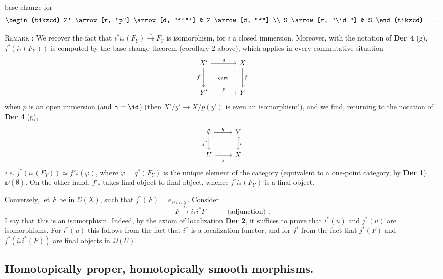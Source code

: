 
\noindent{}
base change for
\[
\begin{tikzcd}
Z' \arrow[r, "p"] \arrow[d, "f'"'] & Z \arrow[d, "f"] \\
S \arrow[r, "\id"] & S
\end{tikzcd}
\qquad .
\]

\noindent\textsc{Remark} : We recover the fact that $i^*i_*(F_Y) \overset{\sim}{\to} F_Y$ is isomorphism, for $i$ a closed immersion. Moreover, with the notation of \textbf{Der 4} (g), $j^*(i_*(F_Y))$ is computed by the base change theorem (corollary 2 above), which applies in every commutative situation
\[
\begin{tikzcd}[row sep=large, column sep=large]
X' \arrow[r, "q"] \arrow[d, "f'"'] \arrow[dr, phantom, "\text{\scriptsize cart}"] & X \arrow[d, "f"] \\
Y' \arrow[r, "p"] & Y
\end{tikzcd}
\]
when $p$ is an open immersion (and $\gamma = \id$) (then $X'/y' \to X/p(y')$ is even an isomorphism!), and we find, returning to the notation of \textbf{Der 4} (g),
\[
\begin{tikzcd}
\emptyset \arrow[r, "q"] \arrow[d, "f'"'] & Y \arrow[d, hook, "i"] \\
U \arrow[r, hook, "j"'] & X
\end{tikzcd}
\]
\textit{i.e.} $j^*(i_*(F_Y)) \simeq f'_*(\varphi)$, where $\varphi = q^*(F_Y)$ is the unique element of the category (equivalent to a one-point category, by \textbf{Der 1}) $\DD(\emptyset)$. On the other hand, $f'_*$ takes final object to final object, whence $j^*i_*(F_Y)$ is a final object.

Conversely, let $F$ be in $\DD(X)$, such that $j^*(F) = e_{\DD(U)}$. Consider
\[
F \xrightarrow{u} i_*i^*F \qquad\quad \text{(adjunction) ;}
\]
I say that this is an isomorphism. Indeed, by the axiom  of localization \textbf{Der 2}, it suffices to prove that $i^*(u)$ and $j^*(u)$ are isomorphisms. For $i^*(u)$ this follows from the fact that $i^*$ is a localization functor, and for $j^*$ from the fact that $j^*(F)$ and $j^*(i_*i^*(F))$ are final objects in $\DD(U)$.


\noindent{}

\subsection*{Homotopically proper, homotopically smooth morphisms.}

